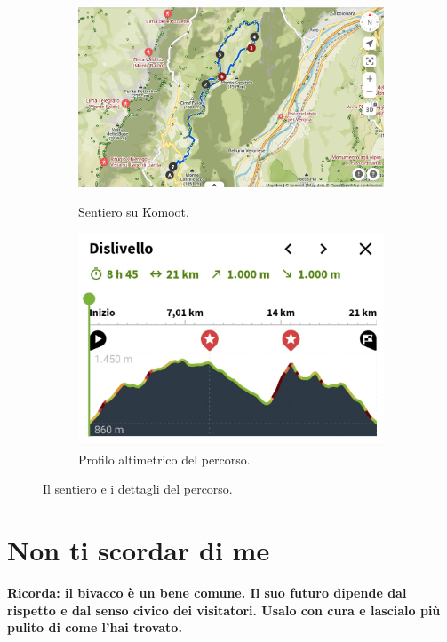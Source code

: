 \documentclass{article}
\begin{document}
\begin{figure}[htbp!]
    \hfill
    \begin{subfigure}[t]{0.45\textwidth}
        \centering
        \vspace{0pt} %
        \includegraphics[width=\textwidth]{images/sentiero_komoot.png}
        \caption{Sentiero su Komoot.}
        \label{fig:foto_corta1}
        \vspace{1em} %
        \includegraphics[width=\textwidth]{images/profilo_altimetrico.png}
        \caption{Profilo altimetrico del percorso.}
        \label{fig:foto_corta2}
    \end{subfigure}
    \caption{Il sentiero e i dettagli del percorso.}
    \label{fig:panoramica_dettagli}
\end{figure}


\section{Non ti scordar di me}
\textbf{\textcolor{BurntOrange}{Ricorda: il bivacco è un bene comune. Il suo futuro dipende dal rispetto e dal senso civico dei visitatori. Usalo con cura e lascialo più pulito di come l'hai trovato.}}
\end{document}

